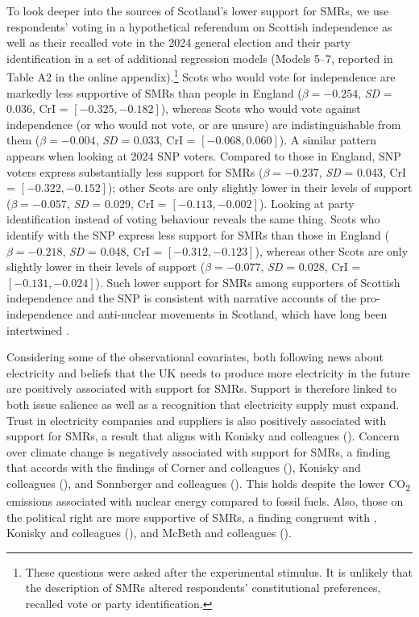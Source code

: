 \documentclass[a4paper, 11pt]{article}
\begin{document}
To look deeper into the sources of Scotland's lower support for SMRs, we use respondents' voting in a hypothetical referendum on Scottish independence as well as their recalled vote in the 2024 general election and their party identification in a set of additional regression models (Models 5--7, reported in Table A2 in the online appendix).\footnote{These questions were asked after the experimental stimulus. It is unlikely that the description of SMRs altered respondents' constitutional preferences, recalled vote or party identification.} Scots who would vote for independence are markedly less supportive of SMRs than people in England ($\beta = -0.254$, \emph{SD} = 0.036, CrI = $[-0.325, -0.182]$), whereas Scots who would vote against independence (or who would not vote, or are unsure) are indistinguishable from them ($\beta = -0.004$, \emph{SD} = 0.033, CrI = $[-0.068, 0.060]$). A similar pattern appears when looking at 2024 SNP voters. Compared to those in England, SNP voters express substantially less support for SMRs ($\beta = -0.237$, \emph{SD} = 0.043, CrI = $[-0.322, -0.152]$); other Scots are only slightly lower in their levels of support ($\beta = -0.057$, \emph{SD} = 0.029, CrI = $[-0.113, -0.002]$). Looking at party identification instead of voting behaviour reveals the same thing. Scots who identify with the SNP express less support for SMRs than those in England ($\beta = -0.218$, \emph{SD} = 0.048, CrI = $[-0.312, -0.123]$), whereas other Scots are only slightly lower in their levels of support ($\beta = -0.077$, \emph{SD} = 0.028, CrI = $[-0.131, -0.024]$). Such lower support for SMRs among supporters of Scottish independence and the SNP is consistent with narrative accounts of the pro-independence and anti-nuclear movements in Scotland, which have long been intertwined \citep{brown2017,ross2024}.

Considering some of the observational covariates, both following news about electricity and beliefs that the UK needs to produce more electricity in the future are positively associated with support for SMRs. Support is therefore linked to both issue salience as well as a recognition that electricity supply must expand. Trust in electricity companies and suppliers is also positively associated with support for SMRs, a result that aligns with Konisky and colleagues (\citeyear{konisky2020}). Concern over climate change is negatively associated with support for SMRs, a finding that accords with the findings of Corner and colleagues (\citeyear{corner2011}), Konisky and colleagues (\citeyear{konisky2020}), and Sonnberger and colleagues (\citeyear{sonnberger2021}). This holds despite the lower CO\textsubscript{2} emissions associated with nuclear energy compared to fossil fuels. Also, those on the political right are more supportive of SMRs, a finding congruent with \citet{franchino2014}, Konisky and colleagues (\citeyear{konisky2020}), and McBeth and colleagues (\citeyear{mcbeth2023}).
\end{document}
